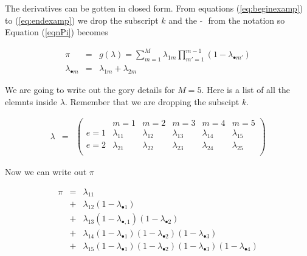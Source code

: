 \documentclass[11pt]{article}
\begin{document}
The derivatives can be gotten in closed form.  From equations 
(\ref{eq:beginexamp}) to (\ref{eq:endexamp}) we drop
 the subscript $k$ and the $\tilde{\mbox{  }}$ from the notation
so Equation (\ref{eqnPi}) becomes


\begin{eqnarray}
\pi & = & g(\lambda) = \sum_{m=1}^{M}
                                  \lambda_{1m}\prod_{m'=1}^{m-1}(1-\lambda_{\bullet
                                    m'}) \label{eq:beginexamp} \\ 
\lambda_{\bullet m} & = & \lambda_{1m} + \lambda_{2m}
\end{eqnarray}

We are going to write out the gory details for $M = 5$.  Here is a list
of all the elemnts inside $\lambda$.  Remember that we are dropping the
subscipt $k$. 

\begin{eqnarray}
\lambda & = & \left( 
                 \begin{array} {cccccc}
                     & m = 1& m = 2& m = 3& m = 4& m = 5 \\
                     e = 1& \lambda_{11}& \lambda_{12}& \lambda_{13}& \lambda_{14}&
                          \lambda_{15} \\
                     e = 2& \lambda_{21}& \lambda_{22}& \lambda_{23}& \lambda_{24}&
                        \lambda_{25} \\
                    \end{array}
                  \right) 
\end{eqnarray}

Now we can write out $\pi$

\begin{eqnarray}
\pi & = & \lambda_{11} \nonumber \\
      & + & \lambda_{12}(1-\lambda_{\bullet 1}) \nonumber \\
      & + & \lambda_{13}(1-\lambda_{\bullet, 1}) (1-\lambda_{\bullet
                  2}) \nonumber \\
      & + & \lambda_{14}(1-\lambda_{\bullet 1}) (1-\lambda_{\bullet 2})
                  (1-\lambda_{\bullet 3})  \nonumber \\
      & + & \lambda_{15}(1-\lambda_{\bullet 1}) (1-\lambda_{\bullet 2})
                  (1-\lambda_{\bullet 3}) (1-\lambda_{\bullet 4}) 
\end{eqnarray}
\end{document}

